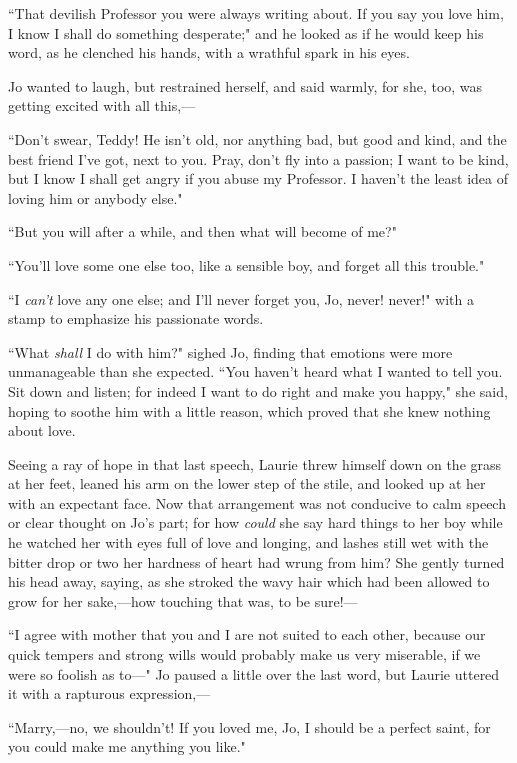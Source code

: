 ``That devilish Professor you were always writing about. If you say you
love him, I know I shall do something desperate;" and he looked as if he
would keep his word, as he clenched his hands, with a wrathful spark in
his eyes.

Jo wanted to laugh, but restrained herself, and said warmly, for she,
too, was getting excited with all this,---

``Don't swear, Teddy! He isn't old, nor
anything bad, but good and kind, and the best friend
I've got, next to you. Pray, don't fly
into a passion; I want to be kind, but I know I shall get angry if you
abuse my Professor. I haven't the least idea of loving
him or anybody else."

``But you will after a while, and then what will become of me?"

``You'll love some one else too, like a sensible boy, and
forget all this trouble."

``I \emph{can't} love any one else; and
I'll never forget you, Jo, never! never!" with a stamp
to emphasize his passionate words.

``What \emph{shall} I do with him?" sighed Jo, finding that emotions were
more unmanageable than she expected. ``You haven't heard
what I wanted to tell you. Sit down and listen; for indeed I want to do
right and make you happy," she said, hoping to soothe him with a little
reason, which proved that she knew nothing about love.

Seeing a ray of hope in that last speech, Laurie threw himself down on
the grass at her feet, leaned his arm on the lower step of the stile,
and looked up at her with an expectant face. Now that arrangement was
not conducive to calm speech or clear thought on Jo's
part; for how \emph{could} she say hard things to her boy while he
watched her with eyes full of love and longing, and lashes still wet
with the bitter drop or two her hardness of heart had wrung from him?
She gently turned his head away, saying, as she stroked the wavy hair
which had been allowed to grow for her sake,---how touching that was, to
be sure!---

``I agree with mother that you and I are not suited to each other,
because our quick tempers and strong wills would probably make us very
miserable, if we were so foolish as to---" Jo paused a little over the
last word, but Laurie uttered it with a rapturous expression,---

``Marry,---no, we shouldn't! If you loved me, Jo, I
should be a perfect saint, for you could make me anything you like."

